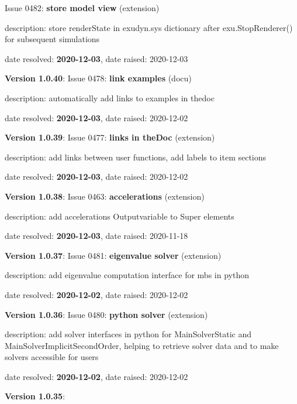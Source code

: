   Issue 0482: {\bf store model view}
(extension)
  \bi
  \item {\small description: store renderState in exudyn.sys dictionary after exu.StopRenderer() for subsequent simulations}
  \item   date resolved: {\bf 2020-12-03},
date raised: 2020-12-03   \ei
  \item {\bf Version 1.0.40}: \vspace{-6pt} 
  Issue 0478: {\bf link examples}
(docu)
  \bi
  \item {\small description: automatically add links to examples in thedoc}
  \item   date resolved: {\bf 2020-12-03},
date raised: 2020-12-02   \ei
  \item {\bf Version 1.0.39}: \vspace{-6pt} 
  Issue 0477: {\bf links in theDoc}
(extension)
  \bi
  \item {\small description: add links between user functions, add labels to item sections}
  \item   date resolved: {\bf 2020-12-03},
date raised: 2020-12-02   \ei
  \item {\bf Version 1.0.38}: \vspace{-6pt} 
  Issue 0463: {\bf accelerations}
(extension)
  \bi
  \item {\small description: add accelerations Outputvariable to Super elements}
  \item   date resolved: {\bf 2020-12-03},
date raised: 2020-11-18   \ei
  \item {\bf Version 1.0.37}: \vspace{-6pt} 
  Issue 0481: {\bf eigenvalue solver}
(extension)
  \bi
  \item {\small description: add eigenvalue computation interface for mbs in python}
  \item   date resolved: {\bf 2020-12-02},
date raised: 2020-12-02   \ei
  \item {\bf Version 1.0.36}: \vspace{-6pt} 
  Issue 0480: {\bf python solver}
(extension)
  \bi
  \item {\small description: add solver interfaces in python for MainSolverStatic and MainSolverImplicitSecondOrder, helping to retrieve solver data and to make solvers accessible for users}
  \item   date resolved: {\bf 2020-12-02},
date raised: 2020-12-02   \ei
  \item {\bf Version 1.0.35}: \vspace{-6pt} 

